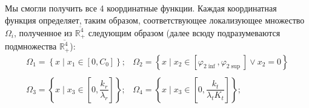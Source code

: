 \documentclass[11pt]{article}
\begin{document}
    Мы смогли получить все 4 координатные функции. Каждая координатная
функция определяет, таким образом, соответствующее локализующее
множество \(\Omega_i\), полученное из \(\overline{\mathbb{R}_{+}^{4}}\)
следующим образом (далее всюду подразумеваются подмножества
\(\overline{\mathbb{R}_{+}^{4}}\)): \begin{equation*}    
    \begin{matrix}
    \Omega_1 = \left\{
            x \;|\; x_1 \in \left[ 0, C_0  \right]
                \right\};
    &
    \Omega_2 = \left\{
            x \;|\; x_2 \in \left[ \varphi_{2 \inf}, \varphi_{2 \sup}  \right] \vee x_2 = 0
                \right\}
    \\ \\
    \Omega_3 = \left\{
        x \;|\; x_3 \in \left[ 0, \dfrac{k_r}{\lambda_r}  \right]
            \right\};
    &
    \Omega_4 = \left\{
        x \;|\; x_3 \in \left[ 0, \dfrac{k_t}{\lambda_t K_t} \right]
            \right\};
    \end{matrix}
\end{equation*}


    
    
    
\end{document}

